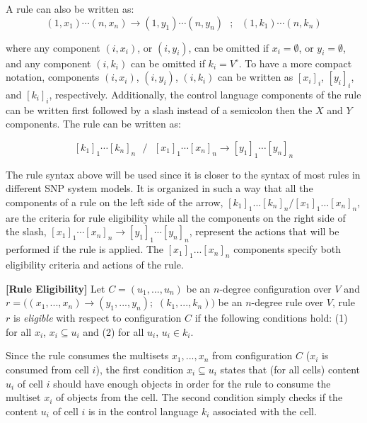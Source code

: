 \documentclass[a4paper]{article}
\theoremstyle{definition}
\newcommand{\ra}{\rightarrow}
\newcommand{\ts}{\text{ }}
\begin{document}
A rule can also be written as:
$$(1,x_1)\cdots(n,x_n)\ra (1,y_1)\cdots(n,y_n)\ts;\ts (1,k_1)\cdots(n,k_n)$$

where any component $(i,x_i)$, or $(i,y_i)$, can be omitted if $x_i = \emptyset$, or 
$y_i = \emptyset$, and any component $(i,k_i)$ can be omitted if $k_i = V^{\circ}$. To have a more
compact notation, components $(i,x_i)$, $(i,y_i)$, $(i,k_i)$ can be written as ${[x_i]}_i$,
${[y_i]}_i$, and ${[k_i]}_i$, respectively. Additionally, the control language components of the 
rule can be written first followed by a slash instead of a semicolon then the $X$ and $Y$ 
components. The rule can be written as:

$${[k_1]}_1\cdots{[k_n]}_n\ts / \ts {[x_1]}_1\cdots {[x_n]}_n \ra {[y_1]}_1\cdots{[y_n]}_n$$

The rule syntax above will be used since it is closer to the syntax of most rules in different SNP 
system models. It is organized in such a way that all the components of a rule on the left side
of the arrow, ${[k_1]}_1 ... {[k_n]}_n/{[x_1]}_1...{[x_n]}_n$, are the criteria for rule eligibility
while all the components on the right side of the slash, 
${[x_1]}_1\cdots {[x_n]}_n \ra {[y_1]}_1\cdots{[y_n]}_n$, represent the actions that will be 
performed if the rule is applied. The ${[x_1]}_1...{[x_n]}_n$ components specify both eligibility
criteria and actions of the rule.


\label{def-elig} \textbf{[Rule Eligibility]} Let $C = (u_1,...,u_n)$ be an $n$-degree
configuration over $V$ and $r = ((x_1,...,x_n) \ra (y_1,...,y_n);$ $(k_1,...,k_n))$ be an $n$-degree
rule over $V$, rule $r$ is \emph{eligible} with respect to configuration $C$ if the following 
conditions hold: (1) for all $x_i$, $x_i \subseteq u_i$ and (2) for all $u_i$, $u_i \in k_i$.

Since the rule consumes the multisets $x_1,...,x_n$ from configuration $C$ ($x_i$ is consumed from
cell $i$), the first condition $x_i \subseteq u_i$ states that (for all cells) content $u_i$ of cell
$i$ should have enough objects in order for the rule to consume the multiset $x_i$ of objects from
the cell. The second condition simply checks if the content $u_i$ of cell $i$ is in the control
language $k_i$ associated with the cell.

\end{document}
